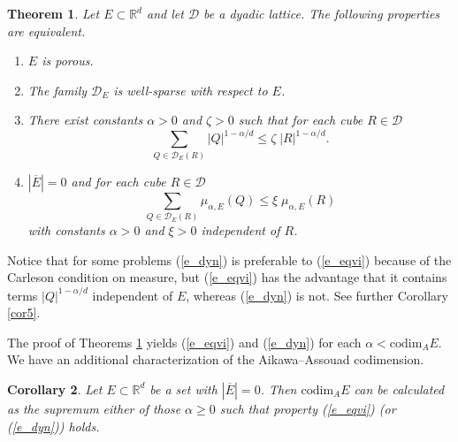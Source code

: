 \documentclass[12pt]{amsart} \setlength{\textwidth}{15cm} \setlength{\textheight}{24cm} \setlength{\voffset}{-1cm} \setlength{\oddsidemargin}{-0.4cm} \setlength{\evensidemargin}{-0.4cm}
\newtheorem {theorem} {Theorem}
\newtheorem {corollary} [theorem]{Corollary}
\theoremstyle{definition}
\theoremstyle{remark}
\newcommand{\rd}{\mathbb{R}^d}
\begin{document}
\begin{theorem} \label{t1}
Let    $E\subset\mathbb{R}^d$ and  let  $\mathcal{D}$  be a dyadic lattice.  The following properties are equivalent.
\begin{enumerate}

   \item[(i)]
    $E$ is porous.
 \item[(ii)]
 The family $\mathcal{D}_E$  is  well-sparse with respect to $E$.
 \item[(iii)]  There exist constants $ \alpha > 0 $ and $ \zeta >0$ such that  for each cube $R \in \mathcal{D}$
    \begin{equation}\label{e_eqvi}
 \sum_{Q \in \mathcal{D}_E (R)}|Q|^{1-\alpha /d}\leq \zeta\; |R|^{1-\alpha /d}.
  \end{equation}
   \item[(iv)]    $|\overline{E}|=0$ and for each cube $R \in \mathcal{D}$
     \begin{equation}\label{e_dyn}
  \sum _ {Q \in \mathcal{D}_E(R)}\mu_{\alpha,E}(Q)\leq \xi\;\mu_{\alpha,E}(R)
  \end{equation}
  with   constants $\alpha > 0$ and $\xi>0$ independent of $R$.
   \end{enumerate}
\end{theorem}
Notice that  for some problems
(\ref{e_dyn}) is preferable to (\ref{e_eqvi}) because of the Carleson  condition on measure,
but   (\ref{e_eqvi}) has the advantage that it  contains terms $|Q|^{1-\alpha /d}$   independent  of  $E$,  whereas (\ref{e_dyn})
is not. See further Corollary \ref{cor5}.


The proof of Theorems \ref{t1}   yields   (\ref{e_eqvi}) and  (\ref{e_dyn})  for each
$ \alpha< \mathrm{codim}_A E$. We have an additional  characterization  of the Aikawa--Assouad codimension.
 \begin{corollary}\label{eqvi}
   Let  $E\subset \rd$ be a set with  $|\overline{E}|=0$. Then    $\mathrm{codim}_A E$  can be calculated as
    the supremum either  of those $\alpha \geq 0$ such that   property  (\ref{e_eqvi}) (or  (\ref{e_dyn}))
              holds.
       \end{corollary}
\end{document}
